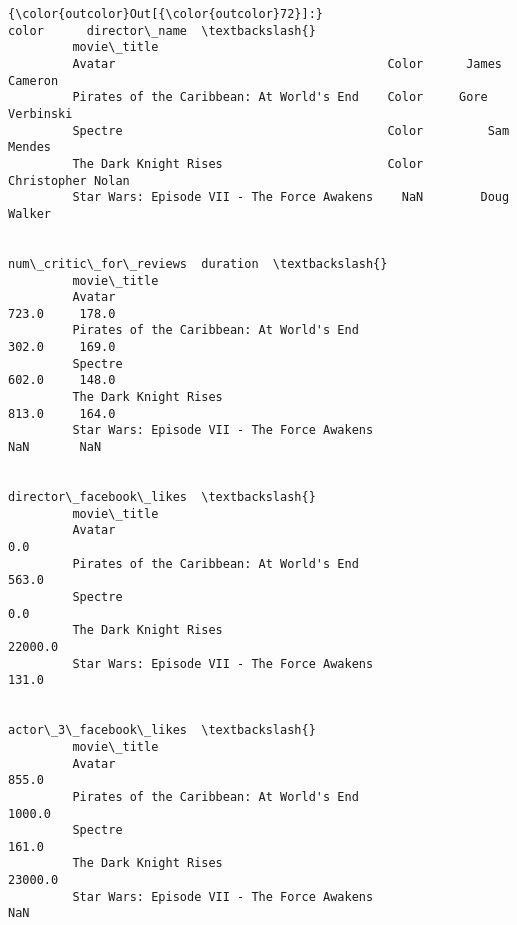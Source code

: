 \documentclass[11pt]{article}
\begin{document}
\begin{Verbatim}[commandchars=\\\{\}]
{\color{outcolor}Out[{\color{outcolor}72}]:}                                             color      director\_name  \textbackslash{}
         movie\_title                                                            
         Avatar                                      Color      James Cameron   
         Pirates of the Caribbean: At World's End    Color     Gore Verbinski   
         Spectre                                     Color         Sam Mendes   
         The Dark Knight Rises                       Color  Christopher Nolan   
         Star Wars: Episode VII - The Force Awakens    NaN        Doug Walker   
         
                                                     num\_critic\_for\_reviews  duration  \textbackslash{}
         movie\_title                                                                    
         Avatar                                                       723.0     178.0   
         Pirates of the Caribbean: At World's End                     302.0     169.0   
         Spectre                                                      602.0     148.0   
         The Dark Knight Rises                                        813.0     164.0   
         Star Wars: Episode VII - The Force Awakens                     NaN       NaN   
         
                                                     director\_facebook\_likes  \textbackslash{}
         movie\_title                                                           
         Avatar                                                          0.0   
         Pirates of the Caribbean: At World's End                      563.0   
         Spectre                                                         0.0   
         The Dark Knight Rises                                       22000.0   
         Star Wars: Episode VII - The Force Awakens                    131.0   
         
                                                     actor\_3\_facebook\_likes  \textbackslash{}
         movie\_title                                                          
         Avatar                                                       855.0   
         Pirates of the Caribbean: At World's End                    1000.0   
         Spectre                                                      161.0   
         The Dark Knight Rises                                      23000.0   
         Star Wars: Episode VII - The Force Awakens                     NaN   
         

\end{Verbatim}
\end{document}
